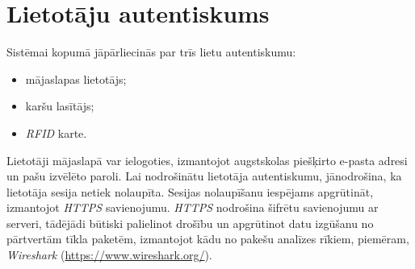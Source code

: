 \section{Lietotāju autentiskums}
Sistēmai kopumā jāpārliecinās par trīs lietu autentiskumu:
\begin{itemize}
	\item mājaslapas lietotājs;
	\item karšu lasītājs;
	\item \textit{RFID} karte.
\end{itemize}
Lietotāji mājaslapā var ielogoties, izmantojot augstskolas piešķirto e-pasta adresi un pašu izvēlēto paroli. Lai nodrošinātu lietotāja autentiskumu, jānodrošina, ka lietotāja sesija netiek nolaupīta. Sesijas nolaupīšanu iespējams apgrūtināt, izmantojot \textit{HTTPS} savienojumu. \textit{HTTPS} nodrošina šifrētu savienojumu ar serveri, tādējādi būtiski palielinot drošību un apgrūtinot datu izgūšanu no pārtvertām tīkla paketēm, izmantojot kādu no pakešu analīzes rīkiem, piemēram, \textit{Wireshark} (\url{https://www.wireshark.org/}).

